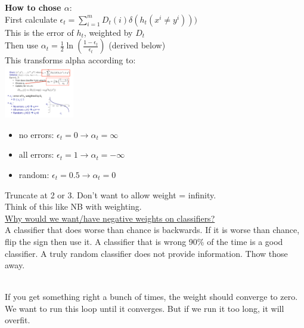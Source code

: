 \textbf{How to chose $\alpha$}: \hfill \\
First calculate $\displaystyle  \epsilon_t = \sum_{i=1}^m D_t(i) \delta(h_t(x^i \neq y^i)))$ \hfill \\
This is the error of $h_t$, weighted by $D_t$ \hfill \\
Then use $\displaystyle  \alpha_t = \frac{1}{2} \ln \left( \frac{1 - \epsilon_t}{\epsilon_t} \right)$  (derived below) \hfill \\
This transforms alpha according to:  \hfill \\
\includegraphics[width=1.2in]{figures/alpha_from_epsilon.pdf}
\begin{itemize}
	\item no errors:  $\epsilon_t = 0 \rightarrow \alpha_t = \infty$
	\item all errors:  $\epsilon_t = 1 \rightarrow \alpha_t = -\infty$
	\item random:  $\epsilon_t = 0.5 \rightarrow \alpha_t = 0$
\end{itemize}
Truncate at 2 or 3.  Don't want to allow weight = infinity. \hfill \\  %
Think of this like NB with weighting. \hfill \\  %
\underline{Why would we want/have negative weights on classifiers?} \hfill \\
A classifier that does worse than chance is backwards. 
If it is worse than chance, flip the sign then use it. 
A classifier that is wrong 90\% of the time is a good classifier.   
A truly random classifier does not provide information.  Thow those away.

\hfill \\
If you get something right a bunch of times, the weight should converge to zero.  %
\hfill \\

We want to run this loop until it converges.  
But if we run it too long, it will overfit. 

